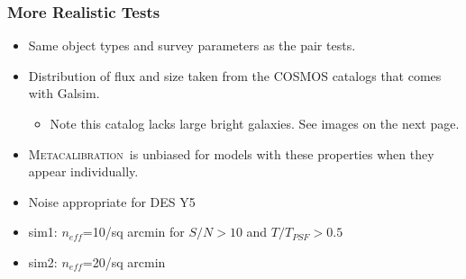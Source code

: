 \documentclass{beamer}
\newcommand{\Mcal}{\textsc{Metacalibration}}
\newcommand{\neff}{$n_{eff}$}
\begin{document}
\frame
{
    \frametitle{More Realistic Tests}

 
    \begin{itemize}

        \item Same object types and survey parameters as the pair tests.

        \item Distribution of flux and size taken from the COSMOS catalogs
            that comes with Galsim.
            \begin{itemize}
                \item Note this catalog lacks large bright galaxies. See images
                    on the next page.
            \end{itemize}

        \item \Mcal\ is unbiased for models with these properties when they
            appear individually.

        \item Noise appropriate for DES Y5

        \item sim1: \neff=10/sq arcmin for $S/N > 10$ and $T/T_{PSF} > 0.5$
            
        \item sim2: \neff=20/sq arcmin


    \end{itemize}

}
\end{document}
